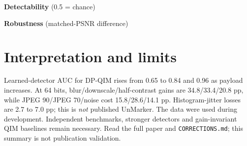 \documentclass[10pt]{article}
\begin{document}
\begin{minipage}[t]{0.48\linewidth}
\textbf{Detectability} (0.5 = chance)\\[2pt]
\resizebox{\linewidth}{!}{}
\end{minipage}\hfill
\begin{minipage}[t]{0.48\linewidth}
\textbf{Robustness} (matched-PSNR difference)\\[2pt]
\resizebox{\linewidth}{!}{}
\end{minipage}

\section*{Interpretation and limits}
Learned-detector AUC for DP-QIM rises from 0.65 to 0.84 and 0.96 as
payload increases. At 64 bits, blur/downscale/half-contrast gains are
34.8/33.4/20.8 pp, while JPEG 90/JPEG 70/noise cost 15.8/28.6/14.1 pp.
Histogram-jitter losses are 2.7 to 7.0 pp; this is \emph{not} published UnMarker.
The data were used during development. Independent benchmarks, stronger
detectors and gain-invariant QIM baselines remain necessary. Read the full
paper and \texttt{CORRECTIONS.md}; this summary is not publication validation.
\end{document}

